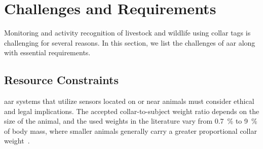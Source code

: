 \section{Challenges and Requirements}
\label{sec:intro_challenges}

Monitoring and activity recognition of livestock and wildlife using collar tags is challenging for several reasons. 
In this section, we list the challenges of \gls{aar} along with essential requirements.


\subsection{Resource Constraints}
\label{challenges:resource}
\gls{aar} systems that utilize sensors located on or near animals must consider ethical and legal implications.
The accepted collar-to-subject weight ratio depends on the size of the animal, and the used weights in the literature vary from \SI{0.7}{\%} to \SI{9}{\%} of body mass, where smaller animals generally carry a greater proportional collar weight~\cite{Brooks2008, Andrusiak1998}.
